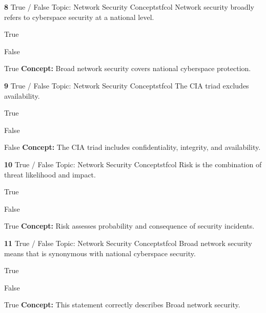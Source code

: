 \documentclass[10pt,a4paper]{article}
\begin{document}
\begin{qcard}{\color{white}\textbf{8} \hfill \small True / False \textbar{} Topic: Network Security Concepts}{tfcol}
Network security broadly refers to cyberspace security at a national level.

\begin{qoptions}
\item True
\item False
\end{qoptions}
\begin{explainbox}{True}
\textbf{Concept:} Broad network security covers national cyberspace protection.
\end{explainbox}
\end{qcard}

\begin{qcard}{\color{white}\textbf{9} \hfill \small True / False \textbar{} Topic: Network Security Concepts}{tfcol}
The CIA triad excludes availability.

\begin{qoptions}
\item True
\item False
\end{qoptions}
\begin{explainbox}{False}
\textbf{Concept:} The CIA triad includes confidentiality, integrity, and availability.
\end{explainbox}
\end{qcard}

\begin{qcard}{\color{white}\textbf{10} \hfill \small True / False \textbar{} Topic: Network Security Concepts}{tfcol}
Risk is the combination of threat likelihood and impact.

\begin{qoptions}
\item True
\item False
\end{qoptions}
\begin{explainbox}{True}
\textbf{Concept:} Risk assesses probability and consequence of security incidents.
\end{explainbox}
\end{qcard}

\begin{qcard}{\color{white}\textbf{11} \hfill \small True / False \textbar{} Topic: Network Security Concepts}{tfcol}
Broad network security means that is synonymous with national cyberspace security.

\begin{qoptions}
\item True
\item False
\end{qoptions}
\begin{explainbox}{True}
\textbf{Concept:} This statement correctly describes Broad network security.
\end{explainbox}
\end{qcard}
\end{document}
